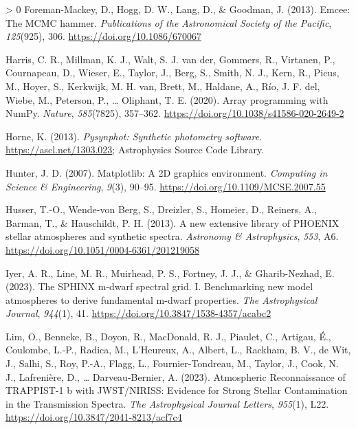 \documentclass[10pt,a4paper,onecolumn]{article}
\newlength{\cslhangindent}
\newenvironment{CSLReferences}[3] %
 {%
  \setlength{\parindent}{0pt}
  \ifodd #1 \everypar{\setlength{\hangindent}{\cslhangindent}}\ignorespaces\fi
  \ifnum #2 > 0
  \setlength{\parskip}{#2\baselineskip}
  \fi
 }%
 {}
\begin{document}
\begin{CSLReferences}{1}{0}
\leavevmode\hypertarget{ref-ForemanMackey:2013}{}%
Foreman-Mackey, D., Hogg, D. W., Lang, D., \& Goodman, J. (2013). Emcee:
The MCMC hammer. \emph{Publications of the Astronomical Society of the
Pacific}, \emph{125}(925), 306. \url{https://doi.org/10.1086/670067}

\leavevmode\hypertarget{ref-harris2020array}{}%
Harris, C. R., Millman, K. J., Walt, S. J. van der, Gommers, R.,
Virtanen, P., Cournapeau, D., Wieser, E., Taylor, J., Berg, S., Smith,
N. J., Kern, R., Picus, M., Hoyer, S., Kerkwijk, M. H. van, Brett, M.,
Haldane, A., Río, J. F. del, Wiebe, M., Peterson, P., \ldots{} Oliphant,
T. E. (2020). Array programming with {NumPy}. \emph{Nature},
\emph{585}(7825), 357--362.
\url{https://doi.org/10.1038/s41586-020-2649-2}

\leavevmode\hypertarget{ref-pysynphot}{}%
Horne, K. (2013). \emph{Pysynphot: Synthetic photometry software}.
\url{https://ascl.net/1303.023}; Astrophysics Source Code Library.

\leavevmode\hypertarget{ref-Hunter:2007}{}%
Hunter, J. D. (2007). Matplotlib: A 2D graphics environment.
\emph{Computing in Science \& Engineering}, \emph{9}(3), 90--95.
\url{https://doi.org/10.1109/MCSE.2007.55}

\leavevmode\hypertarget{ref-Husser:2013}{}%
Husser, T.-O., Wende-von Berg, S., Dreizler, S., Homeier, D., Reiners,
A., Barman, T., \& Hauschildt, P. H. (2013). A new extensive library of
PHOENIX stellar atmospheres and synthetic spectra. \emph{Astronomy \&
Astrophysics}, \emph{553}, A6.
\url{https://doi.org/10.1051/0004-6361/201219058}

\leavevmode\hypertarget{ref-Iyer:2023}{}%
Iyer, A. R., Line, M. R., Muirhead, P. S., Fortney, J. J., \&
Gharib-Nezhad, E. (2023). The SPHINX m-dwarf spectral grid. I.
Benchmarking new model atmospheres to derive fundamental m-dwarf
properties. \emph{The Astrophysical Journal}, \emph{944}(1), 41.
\url{https://doi.org/10.3847/1538-4357/acabc2}

\leavevmode\hypertarget{ref-Lim2023}{}%
Lim, O., Benneke, B., Doyon, R., MacDonald, R. J., Piaulet, C., Artigau,
É., Coulombe, L.-P., Radica, M., L'Heureux, A., Albert, L., Rackham, B.
V., de Wit, J., Salhi, S., Roy, P.-A., Flagg, L., Fournier-Tondreau, M.,
Taylor, J., Cook, N. J., Lafrenière, D., \ldots{} Darveau-Bernier, A.
(2023). {Atmospheric Reconnaissance of TRAPPIST-1 b with JWST/NIRISS:
Evidence for Strong Stellar Contamination in the Transmission Spectra}.
\emph{The Astrophysical Journal Letters}, \emph{955}(1), L22.
\url{https://doi.org/10.3847/2041-8213/acf7c4}


\end{CSLReferences}
\end{document}

